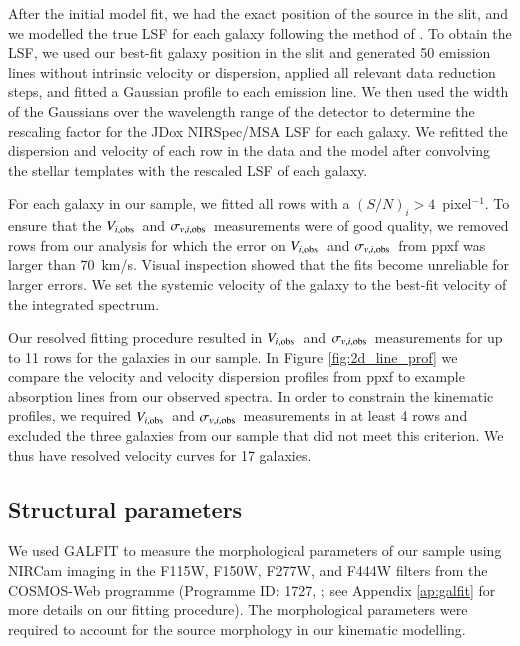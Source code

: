 \documentclass{aa}
\newcommand{\vobsi}{$V_{i,{\rm obs}}$}
\newcommand{\sigmaobsi}{$\sigma_{v,i,{\rm obs}}$}
\begin{document}
After the initial model fit, we had the exact position of the source in the slit, and we modelled the true LSF for each galaxy following the method of \citet{MSlob2024}. To obtain the LSF, we used our best-fit galaxy position in the slit and generated 50 emission lines without intrinsic velocity or dispersion, applied all relevant data reduction steps, and fitted a Gaussian profile to each emission line. We then used the width of the Gaussians over the wavelength range of the detector to determine the rescaling factor for the JDox NIRSpec/MSA LSF for each galaxy. We refitted the dispersion and velocity of each row in the data and the model after convolving the stellar templates with the rescaled LSF of each galaxy.

For each galaxy in our sample, we fitted all rows with a $(S/N)_i > 4$~pixel$^{-1}$. To ensure that the \vobsi\ and \sigmaobsi\ measurements were of good quality, we removed rows from our analysis for which the error on \vobsi\ and \sigmaobsi\ from {\sc ppxf} was larger than 70~km/s. Visual inspection showed that the fits become unreliable for larger errors. We set the systemic velocity of the galaxy to the best-fit velocity of the integrated spectrum.

Our resolved fitting procedure resulted in \vobsi\ and \sigmaobsi\ measurements for up to 11 rows for the galaxies in our sample. In Figure \ref{fig:2d_line_prof} we compare the velocity and velocity dispersion profiles from {\sc ppxf} to example absorption lines from our observed spectra.
In order to constrain the kinematic profiles, we required \vobsi\ and \sigmaobsi\ measurements in at least 4 rows and excluded the three galaxies from our sample that did not meet this criterion. We thus have resolved velocity curves for 17 galaxies.

\subsection{Structural parameters}\label{sec:galfit}
We used \textsc{GALFIT} \citep{CPeng2002,CPeng2010} to measure the morphological parameters of our sample using NIRCam imaging in the F115W, F150W, F277W, and F444W filters from the COSMOS-Web programme (Programme ID: 1727, \citealt{CCasey2023}; see Appendix \ref{ap:galfit} for more details on our fitting procedure). The morphological parameters were required to account for the source morphology in our kinematic modelling. 
\end{document}

